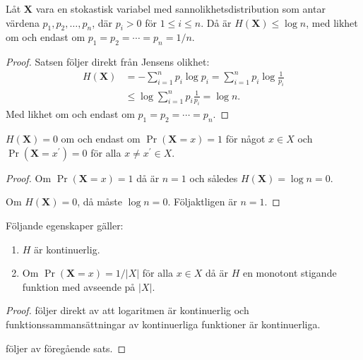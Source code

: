 \documentclass{beamer}
\let\stoch\mathbf{}
\begin{document}
\begin{frame}
  \begin{theorem}
    Låt \(\stoch X\) vara en stokastisk variabel med sannolikhetsdistribution 
    som antar värdena \(p_1, p_2,\ldots, p_n\), där \(p_i > 0\) för \(1\leq 
    i\leq n\).
    Då är \(H(\stoch X)\leq \log n\), med likhet om och endast om \(p_1 = p_2 
    = \cdots = p_n = 1/n\).
  \end{theorem}
\end{frame}

\begin{frame}
  \begin{proof}
    Satsen följer direkt från Jensens olikhet:
    \begin{align*}
      H(\stoch X) &= -\sum_{i=1}^n p_i\log p_i = \sum_{i=1}^n 
      p_i\log\frac{1}{p_i} \\
      &\leq \log\sum_{i=1}^n p_i\frac{1}{p_i} = \log n.
    \end{align*}
    Med likhet om och endast om \(p_1 = p_2 = \cdots = p_n\).
  \end{proof}
\end{frame}

\begin{frame}
  \begin{corollary}
    \(H(\stoch X) = 0\) om och endast om \(\Pr(\stoch X = x) = 1\) för något 
    \(x\in X\) och \(\Pr(\stoch X = x^\prime) = 0\) för alla \(x\neq x^\prime 
    \in X\).
  \end{corollary}

  \begin{proof}
    Om \(\Pr(\stoch X = x) = 1\) då är \(n = 1\) och således \(H(\stoch X) 
    = \log n = 0\).

    Om \(H(\stoch X) = 0\), då måste \(\log n = 0\).
    Följaktligen är \(n = 1\).
  \end{proof}
\end{frame}

\begin{frame}
  \begin{theorem}
    Följande egenskaper gäller:
    \begin{enumerate}
      \item\label{prop:cont} \(H\) är kontinuerlig.
      \item\label{prop:mono} Om \(\Pr(\stoch X = x) = 1/|X|\) för alla \(x\in 
        X\) då är \(H\) en monotont stigande funktion med avseende på \(|X|\).
    \end{enumerate}
  \end{theorem}

  \begin{proof}
     följer direkt av att logaritmen är kontinuerlig och 
    funktionssammansättningar av kontinuerliga funktioner är kontinuerliga.

     följer av föregående sats.
  \end{proof}
\end{frame}
\end{document}
